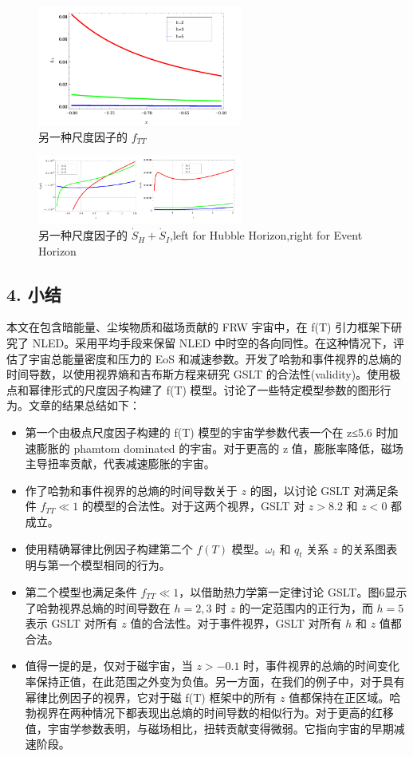 \documentclass[aps,prl,preprint,groupedaddress,showkeys]{revtex4-2}
\begin{document}
\begin{figure}
    \centering
    \includegraphics[width=0.6\textwidth]{fig/fig15.png}
    \caption{另一种尺度因子的 $f_{TT}$}
\end{figure}
\begin{figure}[H]
    \centering
    \includegraphics[width=0.6\textwidth]{fig/fig16.png}
    \caption{另一种尺度因子的 $\dot{S}_H+\dot{S}_I$,left for Hubble Horizon,right for Event Horizon}
\end{figure}

\subsection{4. 小结}

本文在包含暗能量、尘埃物质和磁场贡献的 FRW 宇宙中，在 f(T) 引力框架下研究了 NLED。采用平均手段来保留 NLED 中时空的各向同性。在这种情况下，评估了宇宙总能量密度和压力的 EoS 和减速参数。开发了哈勃和事件视界的总熵的时间导数，以使用视界熵和吉布斯方程来研究 GSLT 的合法性(validity)。使用极点和幂律形式的尺度因子构建了 f(T) 模型。讨论了一些特定模型参数的图形行为。文章的结果总结如下：

\begin{itemize}
    \item 第一个由极点尺度因子构建的 f(T) 模型的宇宙学参数代表一个在 z≤5.6 时加速膨胀的 phamtom dominated 的宇宙。对于更高的 z 值，膨胀率降低，磁场主导扭率贡献，代表减速膨胀的宇宙。
    \item 作了哈勃和事件视界的总熵的时间导数关于 $z$ 的图，以讨论 GSLT 对满足条件 $f_{TT} \ll 1 $  的模型的合法性。对于这两个视界，GSLT 对 $z >8.2$ 和 $z <0$ 都成立。
    \item 使用精确幂律比例因子构建第二个 $f(T)$ 模型。$\omega_t$ 和 $q_t$ 关系 $z$ 的关系图表明与第一个模型相同的行为。
    \item 第二个模型也满足条件 $f_{TT}\ll 1$，以借助热力学第一定律讨论 GSLT。图6显示了哈勃视界总熵的时间导数在 $h = 2,3$ 时 $z$ 的一定范围内的正行为，而 $h = 5$ 表示 GSLT 对所有 $z$ 值的合法性。对于事件视界，GSLT 对所有 $h$ 和 $z$ 值都合法。
    \item 值得一提的是，仅对于磁宇宙，当 $z > -0.1$ 时，事件视界的总熵的时间变化率保持正值，在此范围之外变为负值。另一方面，在我们的例子中，对于具有幂律比例因子的视界，它对于磁 f(T) 框架中的所有 $z$ 值都保持在正区域。哈勃视界在两种情况下都表现出总熵的时间导数的相似行为。对于更高的红移值，宇宙学参数表明，与磁场相比，扭转贡献变得微弱。它指向宇宙的早期减速阶段。
\end{itemize}
\end{document}
